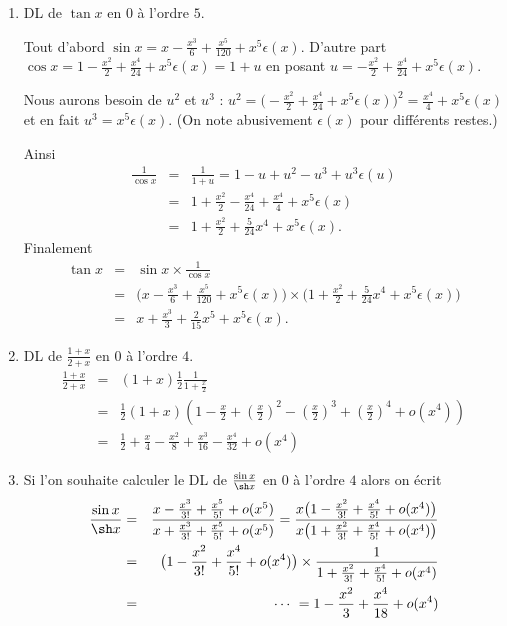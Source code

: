 \documentclass[class=report,crop=false]{standalone}
\begin{document}
\begin{exemple}
\sauteligne
\begin{enumerate}
  \item DL de $\tan x$ en $0$ à l'ordre $5$.

Tout d'abord
$\sin x=x-\frac{x^3}{6}+\frac{x^5}{120}+x^5\epsilon(x)$.
D'autre part
 $\cos  x=1-\frac{x^2}{2}+\frac{x^4}{24} +x^5\epsilon(x)=1+u$
en posant $u= -\frac{x^2}{2}+\frac{x^4}{24} +x^5\epsilon(x)$.

Nous aurons besoin de $u^2$ et $u^3$ :
$u^2 = \big(-\frac{x^2}{2}+\frac{x^4}{24} +x^5\epsilon(x)\big)^2
= \frac{x^4}{4}+x^5\epsilon(x)$ et en fait $u^3 = x^5\epsilon(x)$.
(On note abusivement $\epsilon(x)$ pour différents restes.)

Ainsi
\begin{eqnarray*}
\frac{1}{\cos x} 
  &=& \frac{1}{1+u} =1-u+u^2-u^3+u^3\epsilon(u) \\
  &=& 1+\frac{x^2}{2}-\frac{x^4}{24}+\frac{x^4}{4}+x^5\epsilon(x) \\
  &=& 1+\frac{x^2}{2}+\frac{5}{24}x^4+x^5\epsilon(x).
\end{eqnarray*}
Finalement
\begin{eqnarray*}
\tan x 
  &=& \sin x \times \frac1{\cos x} \\
  &=& \big(x-\frac{x^3}{6}+\frac{x^5}{120}+x^5\epsilon(x)\big)\times\big(1+\frac{x^2}{2}+\frac{5}{24}x^4+x^5\epsilon(x)\big) \\
  &=& x +\frac{x^3}{3}+\frac{2}{15}x^5+x^5\epsilon(x).
\end{eqnarray*}

  \item DL de $\frac{1+x}{2+x}$ en $0$ à l'ordre $4$.
\begin{eqnarray*}
\frac{1+x}{2+x} 
  &=& (1+x)\frac12\frac{1}{1+\frac{x}{2}} \\
  &=& \frac12(1+x) \left( 1-\frac{x}{2}+\left(\frac{x}{2}\right)^2-\left(\frac{x}{2}\right)^3
+\left( \frac{x}{2} \right)^4 + o(x^4) \right) \\
  &=& \frac12+\frac{x}{4}-\frac{x^2}{8}+\frac{x^3}{16}-\frac{x^4}{32} + o(x^4)
\end{eqnarray*}

  \item Si l'on souhaite calculer le DL de $\frac{\sin x}{\sh x}$ en $0$ à l'ordre $4$
alors on écrit
\begin{eqnarray*}
\frac{\sin x}{\sh x} &=&
\frac{x-\frac{x^3}{3!} + \frac{x^5}{5!}+ o(x^5)}{x+\frac{x^3}{3!} + \frac{x^5}{5!} + o(x^5)}
= \frac{x\big(1-\frac{x^2}{3!} + \frac{x^4}{5!}+ o(x^4)\big)}{x\big(1+\frac{x^2}{3!}+ \frac{x^4}{5!} + o(x^4)\big)}
\\
&=& \big(1-\frac{x^2}{3!}  + \frac{x^4}{5!}+ o(x^4)\big) \times \frac{1}{1+\frac{x^2}{3!}+ \frac{x^4}{5!} + o(x^4)}\\
&=& \cdots \  = 1-\frac{x^2}{3}+\frac{x^4}{18} + o(x^4)
\end{eqnarray*}
\end{enumerate}
\end{exemple}
\end{document}

